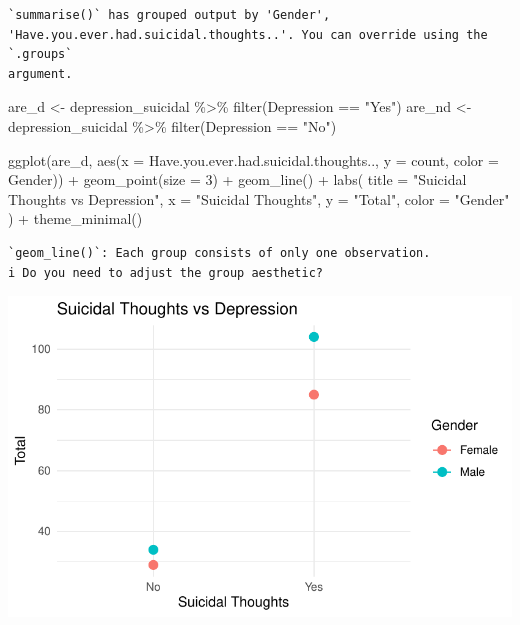 \documentclass[
  letterpaper,
  DIV=11,
  numbers=noendperiod]{scrartcl}
\newenvironment{Shaded}{\begin{snugshade}}{\end{snugshade}}
\newcommand{\AttributeTok}[1]{\textcolor[rgb]{0.40,0.45,0.13}{#1}}
\newcommand{\DecValTok}[1]{\textcolor[rgb]{0.68,0.00,0.00}{#1}}
\newcommand{\FunctionTok}[1]{\textcolor[rgb]{0.28,0.35,0.67}{#1}}
\newcommand{\NormalTok}[1]{\textcolor[rgb]{0.00,0.23,0.31}{#1}}
\newcommand{\OtherTok}[1]{\textcolor[rgb]{0.00,0.23,0.31}{#1}}
\newcommand{\SpecialCharTok}[1]{\textcolor[rgb]{0.37,0.37,0.37}{#1}}
\newcommand{\StringTok}[1]{\textcolor[rgb]{0.13,0.47,0.30}{#1}}
\begin{document}
\begin{verbatim}
`summarise()` has grouped output by 'Gender',
'Have.you.ever.had.suicidal.thoughts..'. You can override using the `.groups`
argument.
\end{verbatim}

\begin{Shaded}
\begin{Highlighting}[]
\NormalTok{are\_d }\OtherTok{\textless{}{-}}\NormalTok{ depression\_suicidal }\SpecialCharTok{\%\textgreater{}\%} \FunctionTok{filter}\NormalTok{(Depression }\SpecialCharTok{==} \StringTok{"Yes"}\NormalTok{)}
\NormalTok{are\_nd }\OtherTok{\textless{}{-}}\NormalTok{ depression\_suicidal }\SpecialCharTok{\%\textgreater{}\%} \FunctionTok{filter}\NormalTok{(Depression }\SpecialCharTok{==} \StringTok{"No"}\NormalTok{)}

\FunctionTok{ggplot}\NormalTok{(are\_d, }\FunctionTok{aes}\NormalTok{(}\AttributeTok{x =}\NormalTok{ Have.you.ever.had.suicidal.thoughts.., }\AttributeTok{y =}\NormalTok{ count, }\AttributeTok{color =}\NormalTok{ Gender)) }\SpecialCharTok{+}
  \FunctionTok{geom\_point}\NormalTok{(}\AttributeTok{size =} \DecValTok{3}\NormalTok{) }\SpecialCharTok{+}    
  \FunctionTok{geom\_line}\NormalTok{() }\SpecialCharTok{+}       
  \FunctionTok{labs}\NormalTok{(}
    \AttributeTok{title =} \StringTok{"Suicidal Thoughts vs Depression"}\NormalTok{,}
    \AttributeTok{x =} \StringTok{"Suicidal Thoughts"}\NormalTok{,}
    \AttributeTok{y =} \StringTok{"Total"}\NormalTok{,}
    \AttributeTok{color =} \StringTok{"Gender"}
\NormalTok{  ) }\SpecialCharTok{+}
  \FunctionTok{theme\_minimal}\NormalTok{() }
\end{Highlighting}
\end{Shaded}

\begin{verbatim}
`geom_line()`: Each group consists of only one observation.
i Do you need to adjust the group aesthetic?
\end{verbatim}

\includegraphics{Data_files/figure-pdf/unnamed-chunk-8-1.pdf}
\end{document}
